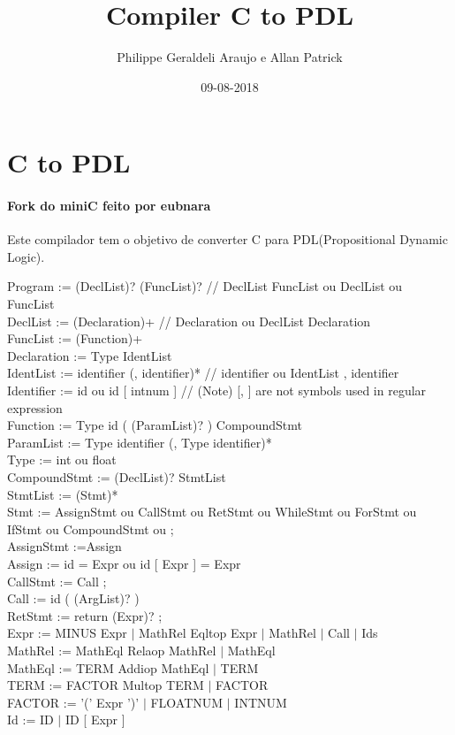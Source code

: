 \documentclass{article}
\title{Compiler C to PDL}
\date{09-08-2018}
\author{Philippe Geraldeli Araujo e Allan Patrick}
\begin{document}
\maketitle
{}
\newpage
{}

\section{C to PDL}

\paragraph{Fork do miniC feito por eubnara\\}
Este compilador tem o objetivo de converter C para PDL(Propositional Dynamic Logic). \vspace{10mm}

\noindent \small 
Program := (DeclList)? (FuncList)?   // DeclList FuncList ou DeclList ou FuncList  \\
DeclList := (Declaration)+          // Declaration ou DeclList Declaration \\
FuncList := (Function)+ \\ 
Declaration := Type IdentList \\
IdentList := identifier (, identifier)*  // identifier ou IdentList , identifier \\
Identifier := id ou id [ intnum ]      // (Note) [, ] are not symbols used in regular expression \\
Function := Type id ( (ParamList)? ) CompoundStmt \\
ParamList := Type identifier (, Type identifier)* \\
Type := int ou float \\
CompoundStmt := { (DeclList)? StmtList } \\
StmtList := (Stmt)* \\
Stmt := AssignStmt ou CallStmt ou RetStmt ou WhileStmt ou ForStmt ou IfStmt ou CompoundStmt ou ; \\
AssignStmt :=Assign  \\
Assign := id = Expr ou id [ Expr ] = Expr \\
CallStmt := Call ; \\
Call := id ( (ArgList)? ) \\
RetStmt := return (Expr)? ;  \\
Expr := MINUS Expr $|$ MathRel Eqltop Expr $|$ MathRel $|$ Call $|$ Ids \\
MathRel := MathEql Relaop MathRel $|$ MathEql \\
MathEql := TERM Addiop MathEql $|$ TERM \\
TERM := FACTOR Multop TERM $|$ FACTOR \\
FACTOR := '(' Expr ')' $|$ FLOATNUM $|$ INTNUM \\
Id := ID $|$ ID [ Expr ] \\
\end{document}

